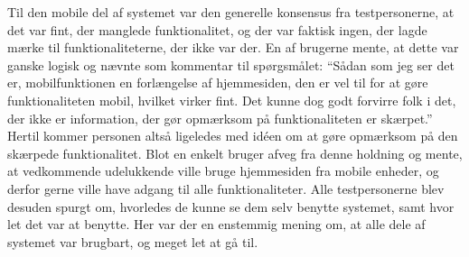 Til den mobile del af systemet var den generelle konsensus fra testpersonerne, at det var fint, der manglede funktionalitet, og der var faktisk ingen, der lagde mærke til funktionaliteterne, der ikke var der. 
En af brugerne mente, at dette var ganske logisk og nævnte som kommentar til spørgsmålet: ``Sådan som jeg ser det er, mobilfunktionen en forlængelse af hjemmesiden, den er vel til for at gøre funktionaliteten mobil, hvilket virker fint. 
Det kunne dog godt forvirre folk i det, der ikke er information, der gør opmærksom på funktionaliteten er skærpet.''
Hertil kommer personen altså ligeledes med idéen om at gøre opmærksom på den skærpede funktionalitet.
Blot en enkelt bruger afveg fra denne holdning og mente, at vedkommende udelukkende ville bruge hjemmesiden fra mobile enheder, og derfor gerne ville have adgang til alle funktionaliteter.
Alle testpersonerne blev desuden spurgt om, hvorledes de kunne se dem selv benytte systemet, samt hvor let det var at benytte.
Her var der en enstemmig mening om, at alle dele af systemet var brugbart, og meget let at gå til.